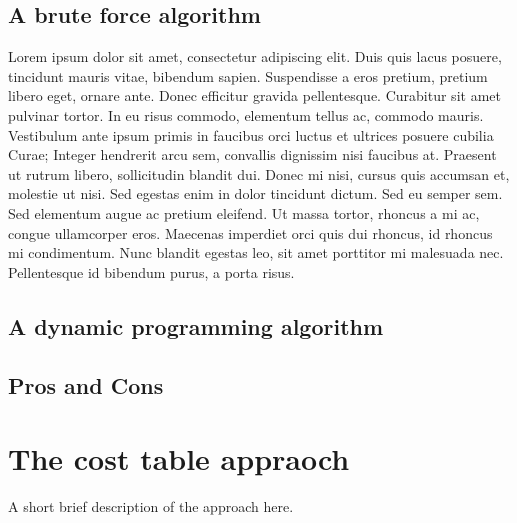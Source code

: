 \documentclass[12pt,a4paper,oneside]{report}
\begin{document}
\section{A brute force algorithm}
Lorem ipsum dolor sit amet, consectetur adipiscing elit. Duis quis lacus posuere, tincidunt mauris vitae, bibendum sapien. Suspendisse a eros pretium, pretium libero eget, ornare ante. Donec efficitur gravida pellentesque. Curabitur sit amet pulvinar tortor. In eu risus commodo, elementum tellus ac, commodo mauris. Vestibulum ante ipsum primis in faucibus orci luctus et ultrices posuere cubilia Curae; Integer hendrerit arcu sem, convallis dignissim nisi faucibus at. Praesent ut rutrum libero, sollicitudin blandit dui. Donec mi nisi, cursus quis accumsan et, molestie ut nisi. Sed egestas enim in dolor tincidunt dictum. Sed eu semper sem. Sed elementum augue ac pretium eleifend. Ut massa tortor, rhoncus a mi ac, congue ullamcorper eros. Maecenas imperdiet orci quis dui rhoncus, id rhoncus mi condimentum. Nunc blandit egestas leo, sit amet porttitor mi malesuada nec. Pellentesque id bibendum purus, a porta risus.

\section{A dynamic programming algorithm}

\section{Pros and Cons}


\chapter{The cost table appraoch}
A short brief description of the approach here.
\end{document}
